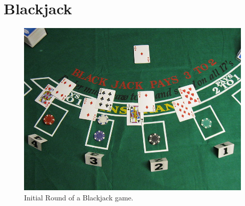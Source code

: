 \section*{Blackjack}
\begin{figure}
\includegraphics[width=\textwidth]{Blackjack_game_1.jpg}
\caption{Initial Round of a Blackjack game.}
\end{figure}

